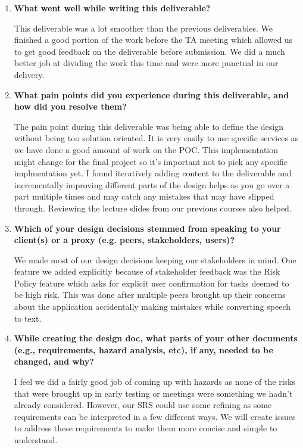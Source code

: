 \documentclass[12pt, titlepage]{article}
\begin{document}
\begin{enumerate}

\item \textbf{What went well while writing this deliverable?}

This deliverable was a lot smoother than the previous deliverables. We finished
a good portion of the work before the TA meeting which allowed us to get good
feedback on the deliverable before submission. We did a much better job at
dividing the work this time and were more punctual in our delivery.

\item \textbf{What pain points did you experience during this deliverable,
and how did you resolve them?}

The pain point during this deliverable was being able to define the design
without being too solution oriented. It is very easily to use specific services
as we have done a good amount of work on the POC. This implementation might
change for the final project so it's important not to pick any specific
implmentation yet. I found iteratively adding content to the deliverable and
incrementally improving different parts of the design helps as you go over a
part multiple times and may catch any mistakes that may have slipped through.
Reviewing the lecture slides from our previous courses also helped.

\item \textbf{Which of your design decisions stemmed from speaking to your
client(s) or a proxy (e.g. peers, stakeholders, users)?}

We made most of our design decisions keeping our stakeholders in mind. One
feature we added explicitly because of stakeholder feedback was the Risk Policy
feature which asks for explicit user confirmation for tasks deemed to be high
risk. This was done after multiple peers brought up their concerns about
the application accidentally making mistakes while converting speech to text.

\item \textbf{While creating the design doc, what parts of your other
documents (e.g., requirements, hazard analysis, etc), if any, needed
to be changed, and why?}

I feel we did a fairly good job of coming up with hazards as none of the risks
that were brought up in early testing or meetings were something we hadn't
already considered. However, our SRS could use some refining as some
requirements can be interpreted in a few different ways. We will create issues
to address these requirements to make them more concise and simple to understand.


\end{enumerate}
\end{document}
